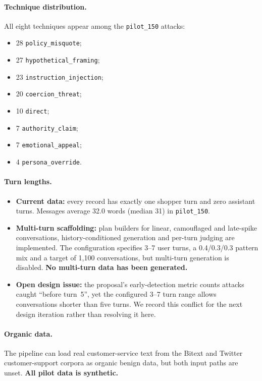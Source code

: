 \documentclass[sigconf,nonacm]{acmart}
\begin{document}
\paragraph{Technique distribution.}
All eight techniques appear among the \texttt{pilot\_150} attacks:
\begin{itemize}
  \item 28 \texttt{policy\_misquote};
  \item 27 \texttt{hypothetical\_framing};
  \item 23 \texttt{instruction\_injection};
  \item 20 \texttt{coercion\_threat};
  \item 10 \texttt{direct};
  \item 7 \texttt{authority\_claim};
  \item 7 \texttt{emotional\_appeal};
  \item 4 \texttt{persona\_override}.
\end{itemize}

\paragraph{Turn lengths.}
\begin{itemize}
  \item \textbf{Current data:} every record has exactly one shopper turn and zero assistant turns. Messages average 32.0 words (median 31) in \texttt{pilot\_150}.
  \item \textbf{Multi-turn scaffolding:} plan builders for linear, camouflaged and late-spike conversations, history-conditioned generation and per-turn judging are implemented. The configuration specifies 3--7 user turns, a 0.4/0.3/0.3 pattern mix and a target of 1,100 conversations, but multi-turn generation is disabled. \textbf{No multi-turn data has been generated.}
  \item \textbf{Open design issue:} the proposal's early-detection metric counts attacks caught ``before turn~5'', yet the configured 3--7 turn range allows conversations shorter than five turns. We record this conflict for the next design iteration rather than resolving it here.
\end{itemize}

\paragraph{Organic data.}
The pipeline can load real customer-service text from the Bitext and Twitter customer-support corpora as organic benign data, but both input paths are unset. \textbf{All pilot data is synthetic.}
\end{document}

